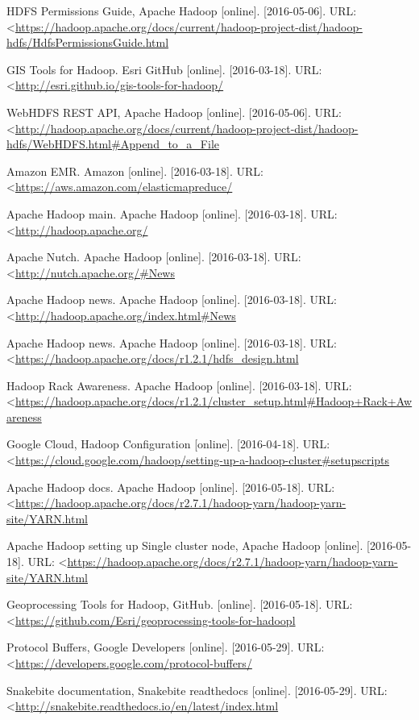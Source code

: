 \documentclass[a4paper,12pt,oneside]{report}
\begin{document}
\begin{thebibliography}{99}
HDFS Permissions Guide, Apache Hadoop  [online]. [2016-05-06]. URL:  \textless\url{https://hadoop.apache.org/docs/current/hadoop-project-dist/hadoop-hdfs/HdfsPermissionsGuide.html}

GIS Tools for Hadoop. Esri GitHub [online]. [2016-03-18]. URL:  \textless\url{http://esri.github.io/gis-tools-for-hadoop/}

WebHDFS REST API, Apache Hadoop  [online]. [2016-05-06]. URL:  \textless\url{http://hadoop.apache.org/docs/current/hadoop-project-dist/hadoop-hdfs/WebHDFS.html#Append_to_a_File
}

Amazon EMR. Amazon [online]. [2016-03-18]. 
URL: \textless\url{https://aws.amazon.com/elasticmapreduce/}

Apache Hadoop main. Apache Hadoop [online]. [2016-03-18]. 
URL: \textless\url{http://hadoop.apache.org/}

Apache Nutch. Apache Hadoop [online]. [2016-03-18]. 
URL: \textless\url{http://nutch.apache.org/#News
}

Apache Hadoop news. Apache Hadoop [online]. [2016-03-18]. 
URL: \textless\url{http://hadoop.apache.org/index.html#News}


Apache Hadoop news. Apache Hadoop [online]. [2016-03-18]. 
URL: \textless\url{https://hadoop.apache.org/docs/r1.2.1/hdfs_design.html}


Hadoop Rack Awareness. Apache Hadoop [online]. [2016-03-18]. 
URL: \textless\url{https://hadoop.apache.org/docs/r1.2.1/cluster_setup.html#Hadoop+Rack+Awareness}

Google Cloud, Hadoop Configuration [online]. [2016-04-18]. 
URL: \textless\url{https://cloud.google.com/hadoop/setting-up-a-hadoop-cluster#setupscripts}

Apache Hadoop docs. Apache Hadoop [online]. [2016-05-18]. 
URL: \textless\url{https://hadoop.apache.org/docs/r2.7.1/hadoop-yarn/hadoop-yarn-site/YARN.html}

Apache Hadoop setting up Single cluster node, Apache Hadoop [online]. [2016-05-18]. 
URL: \textless\url{https://hadoop.apache.org/docs/r2.7.1/hadoop-yarn/hadoop-yarn-site/YARN.html}


Geoprocessing Tools for Hadoop, GitHub. [online]. [2016-05-18]. 
URL: \textless\url{https://github.com/Esri/geoprocessing-tools-for-hadoopl}

Protocol Buffers, Google Developers [online]. [2016-05-29]. 
URL: \textless\url{https://developers.google.com/protocol-buffers/}

Snakebite documentation, Snakebite readthedocs [online]. [2016-05-29]. 
URL: \textless\url{http://snakebite.readthedocs.io/en/latest/index.html
}

\end{thebibliography}
\end{document}
